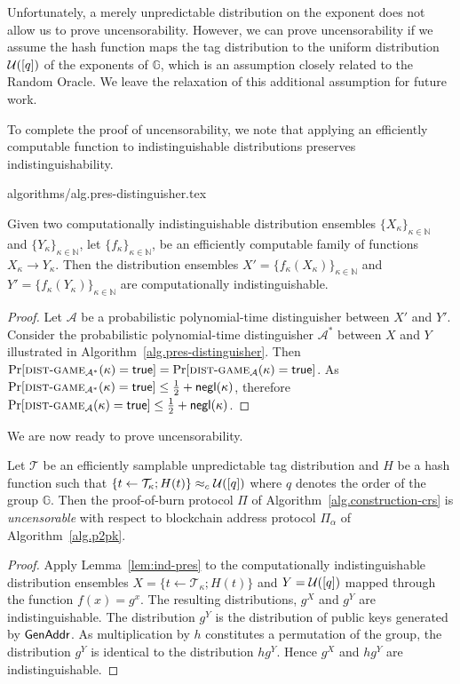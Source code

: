 Unfortunately, a merely unpredictable distribution on the exponent does not allow us to prove uncensorability. However, we can prove uncensorability if we assume the hash function maps the tag distribution to the uniform distribution $\mathcal{U}([q])$ of the exponents of $\mathbb{G}$, which is an assumption closely related to the Random Oracle. We leave the relaxation of this additional assumption for future work.

To complete the proof of uncensorability, we note that applying an efficiently computable function to indistinguishable distributions preserves indistinguishability.

{algorithms/alg.pres-distinguisher.tex}

\begin{lemma}\label{lem:ind-pres}
  Given two
  computationally indistinguishable distribution ensembles
  $\{X_\kappa\}_{\kappa\in\mathbb{N}}$ and $\{Y_\kappa\}_{\kappa\in\mathbb{N}}$,
  let
  $\{f_\kappa\}_{\kappa\in\mathbb{N}}$,
  be an efficiently computable family of functions $X_\kappa \longrightarrow Y_\kappa$.
  Then the distribution ensembles
  $X' = \{f_\kappa(X_\kappa)\}_{\kappa\in\mathbb{N}}$
  and
  $Y' = \{f_\kappa(Y_\kappa)\}_{\kappa\in\mathbb{N}}$
  are computationally indistinguishable.
\end{lemma}
\begin{proof}
  Let $\mathcal{A}$ be a probabilistic polynomial-time distinguisher
  between $X'$ and $Y'$. Consider the probabilistic polynomial-time distinguisher $\mathcal{A}^*$ between $X$ and $Y$ illustrated in Algorithm~\ref{alg.pres-distinguisher}. Then
  $\Pr[\textsc{dist}\-\text{-}\-\textsc{game}_{\mathcal{A}^*}(\kappa) = \mathsf{true}] =
   \Pr[\textsc{dist}\-\text{-}\-\textsc{game}_{\mathcal{A}}(\kappa) = \mathsf{true}]$.
  As $\Pr[\textsc{dist}\-\text{-}\-\textsc{game}_{\mathcal{A}^*}(\kappa) = \mathsf{true}] \leq \frac{1}{2} + \textsf{negl}(\kappa)$, therefore $\Pr[\textsc{dist}\-\text{-}\-\textsc{game}_{\mathcal{A}}(\kappa) = \mathsf{true}] \leq \frac{1}{2} + \textsf{negl}(\kappa)$.
\end{proof}

We are now ready to prove uncensorability.

\begin{theorem}[Uncensorability]
  Let $\mathcal{T}$ be an efficiently samplable unpredictable tag distribution and $H$ be a hash function such that $\{t \gets \mathcal{T}_\kappa; H(t)\} \approx_c \mathcal{U}([q])$ where $q$ denotes the order of the group $\mathbb{G}$. Then the proof-of-burn protocol $\Pi$ of Algorithm~\ref{alg.construction-crs} is \emph{uncensorable} with respect to blockchain address protocol $\Pi_\alpha$ of Algorithm~\ref{alg.p2pk}.
\end{theorem}
\begin{proof}
  Apply Lemma~\ref{lem:ind-pres} to the computationally indistinguishable distribution ensembles $X = \{t \gets \mathcal{T}_\kappa; H(t)\}$ and $Y = \mathcal{U}([q])$ mapped through the function $f(x) = g^x$. The resulting distributions, $g^X$ and $g^Y$ are
  indistinguishable. The distribution $g^Y$ is the distribution of public keys
  generated by $\mathsf{GenAddr}$. As multiplication by $h$ constitutes a permutation
  of the group, the distribution $g^Y$ is identical to the distribution $h g^Y$.
  Hence $g^X$ and $h g^Y$ are indistinguishable.
\end{proof}

